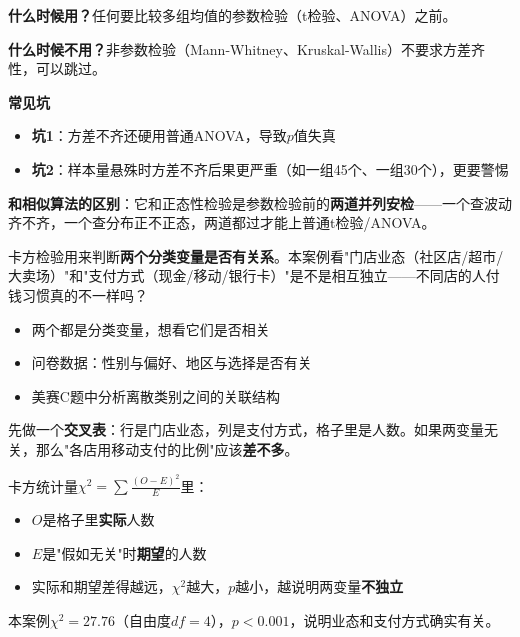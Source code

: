 \begin{algonotes}
\textbf{什么时候用？}任何要比较多组均值的参数检验（t检验、ANOVA）之前。

\textbf{什么时候不用？}非参数检验（Mann-Whitney、Kruskal-Wallis）不要求方差齐性，可以跳过。

\textbf{常见坑}
\begin{itemize}
    \item \textbf{坑1}：方差不齐还硬用普通ANOVA，导致$p$值失真
    \item \textbf{坑2}：样本量悬殊时方差不齐后果更严重（如一组45个、一组30个），更要警惕
\end{itemize}

\textbf{和相似算法的区别}：它和正态性检验是参数检验前的\textbf{两道并列安检}——一个查波动齐不齐，一个查分布正不正态，两道都过才能上普通t检验/ANOVA。
\end{algonotes}


\begin{algointro}
卡方检验用来判断\textbf{两个分类变量是否有关系}。本案例看"门店业态（社区店/超市/大卖场）"和"支付方式（现金/移动/银行卡）"是不是相互独立——不同店的人付钱习惯真的不一样吗？
\end{algointro}

\begin{algoscene}
\begin{itemize}
    \item 两个都是分类变量，想看它们是否相关
    \item 问卷数据：性别与偏好、地区与选择是否有关
    \item 美赛C题中分析离散类别之间的关联结构
\end{itemize}
\end{algoscene}

\begin{algoprinciple}
先做一个\textbf{交叉表}：行是门店业态，列是支付方式，格子里是人数。如果两变量无关，那么"各店用移动支付的比例"应该\textbf{差不多}。

卡方统计量$\chi^2=\sum\frac{(O-E)^2}{E}$里：
\begin{itemize}
    \item $O$是格子里\textbf{实际}人数
    \item $E$是"假如无关"时\textbf{期望}的人数
    \item 实际和期望差得越远，$\chi^2$越大，$p$越小，越说明两变量\textbf{不独立}
\end{itemize}

本案例$\chi^2=27.76$（自由度$df=4$），$p<0.001$，说明业态和支付方式确实有关。
\end{algoprinciple}

